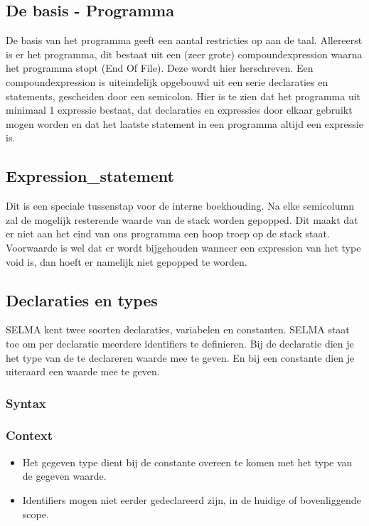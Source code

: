 \documentclass[]{article}
\begin{document}
\subsection{De basis - Programma}
De basis van het programma geeft een aantal restricties op aan de taal.
Allereerst is er het programma, dit bestaat uit een (zeer grote) compoundexpression waarna het programma stopt (End Of File). Deze wordt hier herschreven. Een compoundexpression is uiteindelijk opgebouwd uit een serie declaraties en statements, gescheiden door een semicolon. Hier is te zien dat het programma uit minimaal 1 expressie bestaat, dat declaraties en expressies door elkaar gebruikt mogen worden en dat het laatste statement in een programma altijd een expressie is.


\subsection{Expression\_statement}
Dit is een speciale tussenstap voor de interne boekhouding. Na elke semicolumn zal de mogelijk resterende waarde van de stack worden gepopped. Dit maakt dat er niet aan het eind van ons programma een hoop troep op de stack staat. Voorwaarde is wel dat er wordt bijgehouden wanneer een expression van het type void is, dan hoeft er namelijk niet gepopped te worden.


\subsection{Declaraties en types}
SELMA kent twee soorten declaraties, variabelen en constanten. SELMA staat toe om per declaratie meerdere identifiers te definieren. Bij de declaratie dien je het type van de te declareren waarde mee te geven. En bij een constante dien je uiteraard een waarde mee te geven.
\subsubsection{Syntax}

\subsubsection{Context}
\begin{itemize}
\item Het gegeven type dient bij de constante overeen te komen met het type van de gegeven waarde.
\item Identifiers mogen niet eerder gedeclareerd zijn, in de huidige of bovenliggende scope.
\end{itemize}
\end{document}
